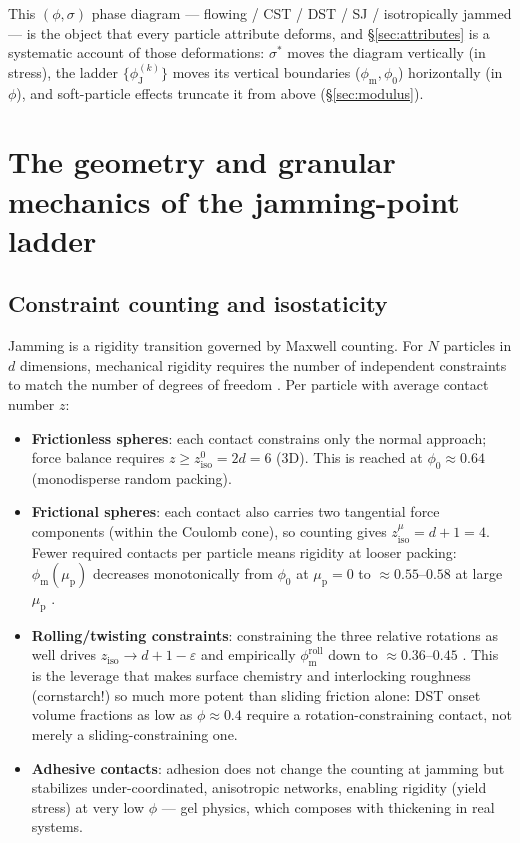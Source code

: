 \documentclass[11pt]{article}
\newcommand{\phiJ}{\phi_{\mathrm{J}}}
\newcommand{\phiO}{\phi_{0}}
\newcommand{\phiM}{\phi_{\mathrm{m}}}
\newcommand{\sigmastar}{\sigma^{*}}
\newcommand{\mup}{\mu_{\mathrm{p}}}
\begin{document}
This $(\phi,\sigma)$ phase diagram --- flowing / CST / DST / SJ / isotropically jammed --- is the object that every particle attribute deforms, and \S\ref{sec:attributes} is a systematic account of those deformations: $\sigmastar$ moves the diagram vertically (in stress), the ladder $\{\phiJ^{(k)}\}$ moves its vertical boundaries ($\phiM,\phiO$) horizontally (in $\phi$), and soft-particle effects truncate it from above (\S\ref{sec:modulus}).

\section{The geometry and granular mechanics of the jamming-point ladder}
\label{sec:geometry}

\subsection{Constraint counting and isostaticity}
\label{sec:isostatic}
Jamming is a rigidity transition governed by Maxwell counting. For $N$ particles in $d$ dimensions, mechanical rigidity requires the number of independent constraints to match the number of degrees of freedom \cite{ohern2003,vanhecke2010}. Per particle with average contact number $z$:

\begin{itemize}
\item \textbf{Frictionless spheres}: each contact constrains only the normal approach; force balance requires $z \ge z_{\mathrm{iso}}^{0} = 2d = 6$ (3D). This is reached at $\phiO \approx 0.64$ (monodisperse random packing).
\item \textbf{Frictional spheres}: each contact also carries two tangential force components (within the Coulomb cone), so counting gives $z_{\mathrm{iso}}^{\mu} = d+1 = 4$. Fewer required contacts per particle means rigidity at looser packing: $\phiM(\mup)$ decreases monotonically from $\phiO$ at $\mup=0$ to $\approx 0.55$--$0.58$ at large $\mup$ \cite{silbert2010,song2008}.
\item \textbf{Rolling/twisting constraints}: constraining the three relative rotations as well drives $z_{\mathrm{iso}} \to d+1-\varepsilon$ and empirically $\phiM^{\mathrm{roll}}$ down to $\approx 0.36$--$0.45$ \cite{singh2020}. This is the leverage that makes surface chemistry and interlocking roughness (cornstarch!) so much more potent than sliding friction alone: DST onset volume fractions as low as $\phi \approx 0.4$ require a rotation-constraining contact, not merely a sliding-constraining one.
\item \textbf{Adhesive contacts}: adhesion does not change the counting at jamming but stabilizes under-coordinated, anisotropic networks, enabling rigidity (yield stress) at very low $\phi$ --- gel physics, which composes with thickening in real systems.
\end{itemize}
\end{document}
